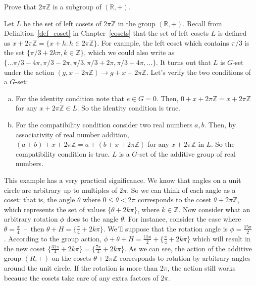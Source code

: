 \begin{exercise}\label{exercise:actions:AngleCoset1}
Prove that $2 \pi \mathbb{Z}$ is a subgroup of $(\mathbb{R},+)$.
\end{exercise}
\begin{example}\label{example:actions:AngleCoset2}
Let $L$ be the set of left cosets of $2\pi \mathbb{Z}$ in the group $(\mathbb{R},+)$.  Recall from Definition~\ref{def_coset} in Chapter~\ref{cosets} that the set of left cosets $L$ is defined as $x+2\pi \mathbb{Z}=\{x+h:h\in 2\pi\mathbb{Z}\}$.  For example, the left coset which contains $\pi/3$ is the set $ \{\pi/3 +2k\pi, k\in \mathbb{Z}\}$, which we could also write as $\{ \ldots \pi/3-4\pi, \pi/3-2\pi, \pi/3, \pi/3+2\pi, \pi/3 + 4\pi, \ldots \}$.  It turns out that $L$ is $G$-set under the action  
$(g,x+2\pi\mathbb{Z}) \rightarrow g+x+2\pi\mathbb{Z}$. Let's verify the two conditions of a $G$-set:
\begin{enumerate}[(a)]
\item
For the identity condition note that $e\in G=0$. Then, $0+x+2\pi\mathbb{Z}=x+2\pi\mathbb{Z}$ for any $x+2\pi\mathbb{Z}\in L$.  So the identity condition is true.
\item 
For the compatibility condition consider two real numbers $a,b$.  Then, by associativity of real number addition, $(a+b)+x+2\pi\mathbb{Z}=a+(b+x+2\pi\mathbb{Z})$ for any $x+2\pi\mathbb{Z}$  in $L$.  So the compatibility condition is true.  $L$ is a $G$-set of the additive group of real numbers.
\end{enumerate}
This example has a very practical significance. We know that angles on a unit circle are arbitrary up to multiples of $2\pi$. So we can think of each angle as a coset:  that is, the angle $\theta$ where $0\leq\theta<2\pi$ corresponds to  the coset $\theta + 2\pi \mathbb{Z}$, which represents the set of values $\{\theta +2k\pi\}$, where $k \in \mathbb{Z}$. Now consider what an arbitrary rotation $\phi$ does to the angle $\theta$. For instance, consider the case where $\theta=\frac{\pi}{4}$~--~then $\theta+H=\{ \frac{\pi}{4}+2k\pi\}$.  We'll suppose that the rotation angle is $\phi=\frac{15\pi}{2}$.  According to the group action, $\phi+\theta+H =\frac{15\pi}{2}+\{\frac{\pi}{4}+2k\pi\}$ which will result in the new coset $\{\frac{31\pi}{4}+2k\pi\}=\{\frac{7\pi}{4}+2k\pi\}$.
As we can see, the action of the additive group $(R,+)$ on the cosets $\theta + 2\pi \mathbb{Z}$ corresponds to rotation by arbitrary angles around the unit circle. If the rotation is more than $2 \pi$, the action still works because the cosets take care of any extra factors of $2 \pi$.
\end{example}

